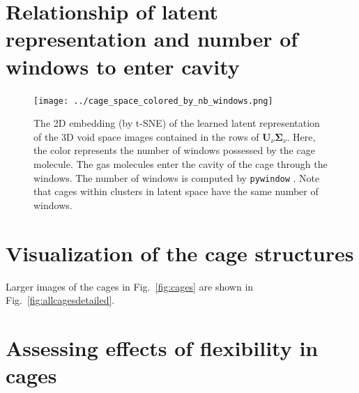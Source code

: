 \documentclass[journal=jacsat,manuscript=article]{achemso}
\begin{document}
\newpage
\clearpage

\section{Relationship of latent representation and number of windows to enter cavity}

\begin{figure}
\centering
	\texttt{[image: ../cage\_space\_colored\_by\_nb\_windows.png]}
	\caption{The 2D embedding (by t-SNE) of the learned latent representation of the 3D void space images contained in the rows of $\mathbf{U}_\nu \mathbf{\Sigma}_\nu$. Here, the color represents the number of windows possessed by the cage molecule. The gas molecules enter the cavity of the cage through the windows. The number of windows is computed by \texttt{pywindow} \cite{miklitz2018pywindow}. Note that cages within clusters in latent space have the same number of windows.
	} \label{fig:cage_space_colored_by_nb_windows}
\end{figure}

\newpage
\clearpage


\section{Visualization of the cage structures}
Larger images of the cages in Fig.~\ref{fig:cages} are shown in Fig.~\ref{fig:allcagesdetailed}.
\captionsetup[subfigure]{labelformat=empty} %


\newpage
\clearpage


\section{\color{red}Assessing effects of flexibility in cages} \label{sec:flexibility}
\end{document}
